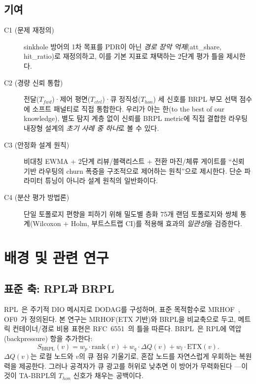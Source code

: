 \documentclass[12pt,a4paper]{article}
\begin{document}
\subsection{기여}

\begin{description}
  \item[C1 (문제 재정의)]
    sinkhole 방어의 1차 목표를 PDR이 아닌
    \emph{경로 장악 억제}(att\_share, hit\_ratio)로 재정의하고,
    이를 기본 지표로 채택하는 2단계 평가 틀을 제시한다.

  \item[C2 (경량 신뢰 통합)]
    전달($T_{fwd}$)·제어 평면($T_{ctrl}$)·큐 정직성($T_{hon}$)
    세 신호를 BRPL 부모 선택 점수에 소프트 패널티로 직접 통합한다.
    우리가 아는 한(to the best of our knowledge),
    별도 탐지 계층 없이 신뢰를 BRPL metric에 직접 결합한
    라우팅 내장형 설계의 \emph{초기 사례 중 하나}로 볼 수 있다.

  \item[C3 (안정화 설계 원칙)]
    비대칭 EWMA + 2단계 리뷰/블랙리스트 + 전환 마진/체류 게이트를
    ``신뢰 기반 라우팅의 churn 폭증을 구조적으로 제어하는 원칙''으로 제시한다.
    단순 파라미터 튜닝이 아니라 설계 원칙의 일반화이다.

  \item[C4 (분산 평가 방법론)]
    단일 토폴로지 편향을 피하기 위해
    밀도별 층화 75개 랜덤 토폴로지와 쌍체 통계(Wilcoxon + Holm, 부트스트랩 CI)를
    적용해 효과의 \emph{일관성}을 검증한다.
\end{description}


\section{배경 및 관련 연구}
\label{sec:background}

\subsection{표준 축: RPL과 BRPL}

RPL~\cite{rfc6550}은 주기적 DIO 메시지로 DODAG를 구성하며,
표준 목적함수로 MRHOF~\cite{rfc6719}, OF0~\cite{rfc6552}가 정의된다.
본 연구는 MRHOF(ETX 기반)와 BRPL을 비교축으로 두고,
메트릭 컨테이너/경로 비용 표현은 RFC~6551~\cite{rfc6551}의 틀을 따른다.
BRPL~\cite{brpl}은 RPL에 역압(backpressure) 항을 추가한다:
\begin{equation}
  S_{\text{BRPL}}(v) = w_p \cdot \text{rank}(v)
                     + w_q \cdot \Delta Q(v)
                     + w_l \cdot \text{ETX}(v).
  \label{eq:brpl}
\end{equation}
$\Delta Q(v)$는 로컬 노드와 $v$의 큐 점유 기울기로,
혼잡 노드를 자연스럽게 우회하는 복원력을 제공한다.
그러나 공격자가 큐 광고를 허위로 낮추면 이 방어가 무력화된다
---이것이 TA-BRPL의 $T_{hon}$ 신호가 채우는 공백이다.
\end{document}
